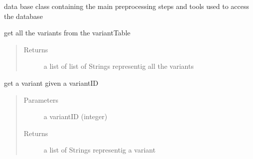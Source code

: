 \documentclass[letterpaper,10pt,english]{sphinxmanual}
\begin{document}
\begin{fulllineitems}
\label{\detokenize{preprocessing:eventLogProcessing.DBTool.DBTool}}
data base class containing the main preprocessing steps and tools used to access the database

\begin{fulllineitems}
\label{\detokenize{preprocessing:eventLogProcessing.DBTool.DBTool.getVariants}}
get all the variants from the variantTable
\begin{quote}\begin{description}
\item[{Returns}] \leavevmode
a list of list of Strings representig all the variants

\end{description}\end{quote}

\end{fulllineitems}


\begin{fulllineitems}
\label{\detokenize{preprocessing:eventLogProcessing.DBTool.DBTool.getVariantByID}}
get a variant given a variantID
\begin{quote}\begin{description}
\item[{Parameters}] \leavevmode
{} \textendash{} a variantID (integer)

\item[{Returns}] \leavevmode
a list of Strings representig a variant

\end{description}\end{quote}

\end{fulllineitems}



\end{fulllineitems}
\end{document}
